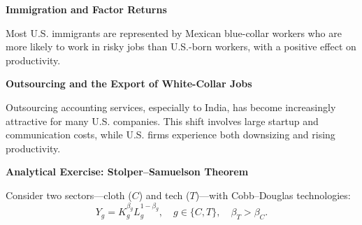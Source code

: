 \documentclass[11pt,letterpaper]{exam}
\begin{document}
\begin{questions}
\question \textbf{Immigration and Factor Returns}

Most U.S. immigrants are represented by Mexican blue-collar workers who are more likely to work in risky jobs than U.S.-born workers, with a positive effect on productivity.


\question \textbf{Outsourcing and the Export of White-Collar Jobs}

Outsourcing accounting services, especially to India, has become increasingly attractive for many U.S. companies. This shift involves large startup and communication costs, while U.S. firms experience both downsizing and rising productivity.


\question \textbf{Analytical Exercise: Stolper–Samuelson Theorem}

Consider two sectors---cloth ($C$) and tech ($T$)---with Cobb–Douglas technologies:
\[
Y_g = K_g^{\beta_g} L_g^{1-\beta_g}, \quad g \in \{C,T\}, \quad \beta_T > \beta_C.
\]


\end{questions}
\end{document}
